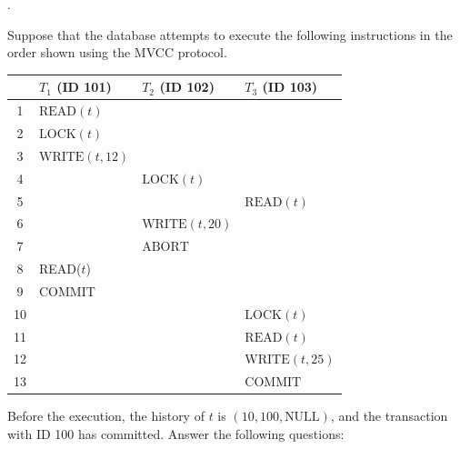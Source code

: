 \pagebreak
.

\vspace{100mm}

 Suppose that the database attempts to execute the following instructions in the order shown using the MVCC protocol.

\begin{center}
\begin{tabular}{c|l|l|l}
    & \(T_{1}\) (ID 101) & \(T_{2}\) (ID 102) & \(T_{3}\) (ID 103)  \\
    \hline
    1 & \(\text{READ}(t)\) & & \\
    2 & \(\text{LOCK}(t)\) & & \\
    3 & \(\text{WRITE}(t, 12)\) & & \\
    4 & & \(\text{LOCK}(t)\) & \\
    5 & & & \(\text{READ}(t)\) \\
    6 & & \(\text{WRITE}(t, 20)\) & \\
    7 & & \(\text{ABORT}\) & \\
    8 & READ($t$) & \\
    9 & \(\text{COMMIT}\) & & \\
    10 & & & \(\text{LOCK}(t)\) \\
    11 & & & \(\text{READ}(t)\) \\
    12 & & & \(\text{WRITE}(t, 25)\) \\
    13 & & & \(\text{COMMIT}\)
\end{tabular}
\end{center}

\noindent Before the execution, the history of $t$ is $(10, 100, \text{NULL})$, and the transaction with ID 100 has committed. Answer the following questions:

